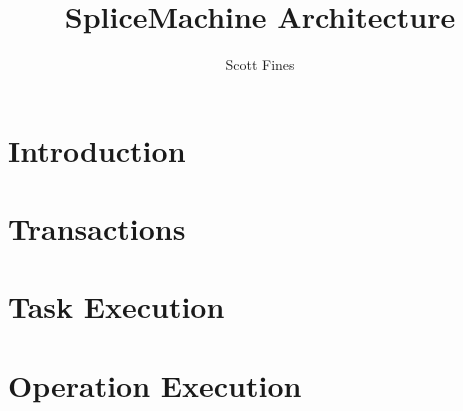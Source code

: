 \documentclass[10pt]{amsbook}
\begin{document}
\title{SpliceMachine Architecture}
\author{Scott Fines}

\maketitle
\begingroup
\let\clearpage\relax
\chapter*{Introduction}

\endgroup

\tableofcontents
\begingroup
\let\clearpage\relax
\chapter{Transactions}

\chapter{Task Execution}

\chapter{Operation Execution}

\endgroup
\end{document}

